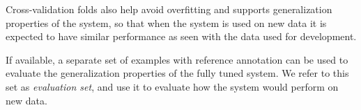 Cross-validation folds also help avoid
overfitting and supports generalization properties of the system, so that when the
system is used on new data it is expected to have similar performance as seen with
the data used for development.

If available, a separate set of examples with reference annotation can be used to
evaluate the generalization properties of the fully tuned system. We refer to this set
as \textit{evaluation set}, and use it to evaluate how the system would perform on new data.

\newpage
